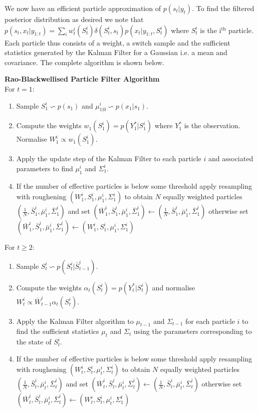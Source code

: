 \documentclass[../masters.tex]{subfiles}
\begin{document}
We now have an efficient particle approximation of $p(s_t|y_t)$. To find the filtered posterior distribution as desired we note that $p(s_t,x_t|y_{1:t}) = \sum_i w_t^i(S_t^i)\delta(S_t^i, s_t)p(x_t|y_{1:t}, S_t^i)$ where $S_t^i$ is the i$^{\text{th}}$ particle. Each particle thus consists of a weight, a switch sample and the sufficient statistics generated by the Kalman Filter for a Gaussian i.e. a mean and covariance. The complete algorithm is shown below.

\textbf{Rao-Blackwellised Particle Filter Algorithm}\\
For $t=1$:
\begin{enumerate}
\item
Sample $S^i_1 \backsim p(s_1)$ and $\mu_{1|0}^i \backsim p(x_1|s_1)$.
\item
Compute the weights $w_1(S_1^i) = p(Y^*_1|S_1^i)$ where $Y^*_1$ is the observation. Normalise $W^i_1 \propto w_1(S^i_1)$.
\item
Apply the update step of the Kalman Filter to each particle $i$ and associated parameters to find $\mu_1^i$ and $\Sigma_1^i$. 
\item
If the number of effective particles is below some threshold apply resampling with roughening $(W^i_1, {S}^i_1,{\mu}^i_1, {\Sigma}^i_1)$ to obtain $N$ equally weighted particles $(\frac{1}{N}, \bar{S}^i_1, \bar{\mu}^i_1, \bar{\Sigma}^i_1)$ and set $(\bar{W}^i_1, \bar{S}^i_1, \bar{\mu}^i_1, \bar{\Sigma}^i_1) \leftarrow (\frac{1}{N}, \bar{S}^i_1, \bar{\mu}^i_1, \bar{\Sigma}^i_1)$ otherwise set $(\bar{W}^i_1, \bar{S}^i_1, \bar{\mu}^i_1, \bar{\Sigma}^i_1) \leftarrow ({W}^i_1, {S}^i_1, \mu^i_1, \Sigma_1^i)$
\end{enumerate}
For $t \geq 2$:
\begin{enumerate}
\item
Sample $S^i_t \backsim p(S_t^i|\bar{S}^i_{t-1})$.
\item
Compute the weights $\alpha_t(S^i_{t}) = p(Y^*_t|S_t^i)$ and normalise $W^i_t \propto \bar{W}^i_{t-1}\alpha_t(S^i_{t})$.
\item
Apply the Kalman Filter algorithm to $\mu_{t-1}$ and $\Sigma_{t-1}$ for each particle $i$ to find the sufficient statistics $\mu_{t}$ and $\Sigma_{t}$ using the parameters corresponding to the state of $S^i_t$.
\item
If the number of effective particles is below some threshold apply resampling with roughening $(W^i_t, {S}^i_t,{\mu}^i_t, {\Sigma}^i_t)$ to obtain $N$ equally weighted particles $(\frac{1}{N}, \bar{S}^i_t, \bar{\mu}^i_t, \bar{\Sigma}^i_t)$ and set $(\bar{W}^i_t, \bar{S}^i_t, \bar{\mu}^i_t, \bar{\Sigma}^i_t) \leftarrow (\frac{1}{N}, \bar{S}^i_t, \bar{\mu}^i_t, \bar{\Sigma}^i_t)$ otherwise set $(\bar{W}^i_t, \bar{S}^i_t, \bar{\mu}^i_t, \bar{\Sigma}^i_t) \leftarrow ({W}^i_t, {S}^i_t, \mu^i_t, \Sigma_1^t)$
\end{enumerate} 
\end{document}
